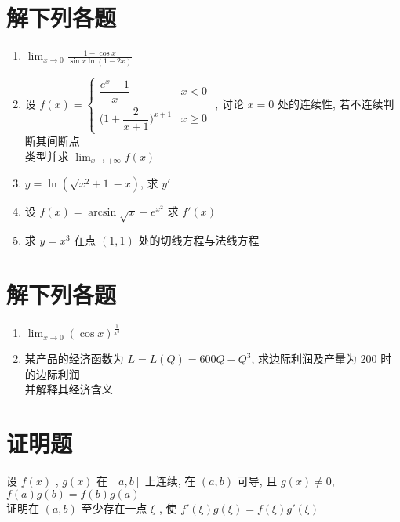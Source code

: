 \documentclass[twocolumn,UTF8]{ctexart}
\begin{document}
\newpage\section{解下列各题}
\begin{enumerate}
\item $\lim_{x\to0}\frac{1-\cos x}{\sin x\ln(1-2x)}$\\[5cm]
\item 设 $f(x)=\left\{\begin{array}{lc}\dfrac{e^x-1}{x}&x<0\\[1.5mm]
\biggl(1+\dfrac{2}{x+1}\biggl)^{x+1}&x\geq 0
\end{array}\right.$ , 讨论 $x=0$ 处的连续性, 若不连续判断其间断点\\[2mm]
类型并求 $\lim_{x\to+\infty}f(x)$\\[7cm]
\item $y=\ln(\sqrt{x^2+1}-x)$,  求 $y'$
\end{enumerate}
\newpage\vspace*{4cm}\begin{enumerate}\setcounter{enumi}{3}
\item 设 $f(x)=\arcsin\sqrt{x}+e^{x^2}$ 求  $f'(x)$\\[7cm]
\item 求 $y=x^3$ 在点 $(1,1)$ 处的切线方程与法线方程\\[7cm]
\end{enumerate}
\newpage\section{解下列各题}
\begin{enumerate}
\item $\lim_{x\to0}(\cos x)^{\frac{1}{x^2}}$\\[7cm]
\item 某产品的经济函数为 $L=L(Q)=600Q-Q^3$, 求边际利润及产量为 200 时的边际利润\\并解释其经济含义
\end{enumerate}
\newpage\section{证明题}
设 $f(x)$ , $g(x)$ 在 $[a,b]$ 上连续, 在 $(a,b)$ 可导, 且 $g(x)\neq0$, $f(a)g(b)=f(b)g(a)$\\
证明在 $(a,b)$ 至少存在一点 $\xi$ , 使 $f'(\xi)g(\xi)=f(\xi)g'(\xi)$
\end{document}
